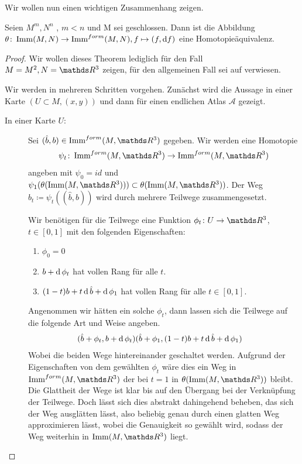 Wir wollen nun einen wichtigen Zusammenhang zeigen. 
\begin{Thm}\label{smalehirsch}
	Seien $M^m,N^n$ \mfgen, $m<n$ und M sei geschlossen. Dann ist die Abbildung
	$\theta \colon \operatorname{Imm}(M,N) \rightarrow \operatorname{Imm}^{form}(M,N), f \mapsto (f,\mathrm{d} f)$ eine Homotopieäquivalenz.
	\begin{proof}
		Wir wollen dieses Theorem lediglich für den Fall $ M=M^2,N=\R^3 $
		zeigen, für den allgemeinen Fall sei auf \cite{SH} verwiesen.

		Wir werden in mehreren Schritten vorgehen. Zunächst wird die Aussage
		in einer Karte $ (U\subset M,(x,y)) $ und dann für einen 
		endlichen Atlas $ \mathcal{A} $ gezeigt.
		\begin{description}
			\item[In einer Karte $ U $:] Sei $ (\hat{b},b) \in \Immf{M}{\R^3}$ gegeben.
			Wir werden eine Homotopie 
			\begin{gather*}
			 \abb{\psi_t}{\Immf{M}{\R^3}}{\Immf{M}{\R^3}} 
			\end{gather*}
			  angeben mit $ \psi_0 = id $ und $ \psi_1(\theta(\Imm{M}{\R^3})) \subset \theta(\Imm{M}{\R^3}) $. Der Weg $ b_t \coloneqq \psi_t((\hat{b},b)) $ wird durch mehrere Teilwege zusammengesetzt.
			  
			  Wir benötigen für die Teilwege eine Funktion $ \abb{\phi_t}{U}{\R^3} $,$ t\in[0,1] $ mit den folgenden Eigenschaften:
			  \begin{enumerate}[\textbullet]
			  	\item $ \phi_0=0 $
			  	\item $b + \operatorname{d} \phi_t$ hat vollen Rang für alle $ t $.
			  	\item $ (1-t)b+t\operatorname{d} \hat{b} + \operatorname{d} \phi_1 $ hat vollen Rang für alle $ t\in[0,1] $.
			  \end{enumerate}
			  Angenommen wir hätten ein solche $ \phi_t $, dann lassen sich
			  die Teilwege auf die folgende Art und Weise angeben.
			  \begin{align*}
			  	(\hat{b} + \phi_t,b+\operatorname{d} \phi_t) & (\hat{b}+\phi_1,(1-t)b+t\operatorname{d} \hat{b} + \operatorname{d} \phi_1)
			  \end{align*}
			  Wobei die beiden Wege hintereinander geschaltet werden.
			  Aufgrund der Eigenschaften von dem gewählten $ \phi_t $ wäre dies
			  ein Weg in $ \Immf{M}{\R^3} $ der bei $ t=1 $ in $ \theta(\Imm{M}{\R^3}) $ bleibt. Die Glattheit der Wege ist klar
			  bis auf den Übergang bei der Verknüpfung der Teilwege. Doch lässt
			  sich dies abstrakt dahingehend beheben, das sich der Weg ausglätten
			  lässt, also beliebig genau durch einen glatten Weg approximieren 
			  lässt, wobei die Genauigkeit so gewählt wird, sodass der Weg
			  weiterhin in $ \Imm{M}{\R^3} $ liegt.
			  

\end{description}
\end{proof}
\end{Thm}
